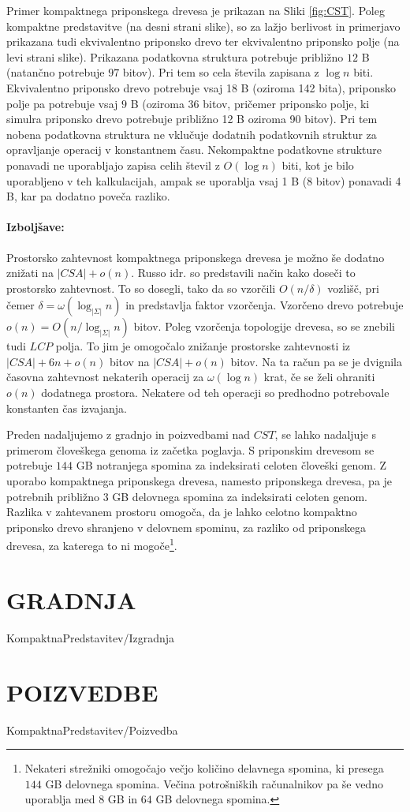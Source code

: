 Primer kompaktnega priponskega drevesa je prikazan na Sliki \ref{fig:CST}. Poleg kompaktne predstavitve (na desni strani slike), so za lažjo berlivost in primerjavo prikazana tudi ekvivalentno priponsko drevo ter ekvivalentno priponsko polje (na levi strani slike). Prikazana podatkovna struktura potrebuje približno $12$ B (natančno potrebuje $97$ bitov). Pri tem so cela števila zapisana z $\log{n}$ biti. Ekvivalentno priponsko drevo potrebuje vsaj 18 B (oziroma 142 bita), priponsko polje pa potrebuje vsaj $9$ B (oziroma 36 bitov, pričemer priponsko polje, ki simulra priponsko drevo potrebuje približno 12 B oziroma 90 bitov). Pri tem nobena podatkovna struktura ne vklučuje dodatnih podatkovnih struktur za opravljanje operacij v konstantnem času. Nekompaktne podatkovne strukture ponavadi ne uporabljajo zapisa celih števil z $O(\log{n})$ biti, kot je bilo uporabljeno v teh kalkulacijah, ampak se uporablja vsaj 1 B (8 bitov) ponavadi 4 B, kar pa dodatno poveča razliko.

\paragraph{Izboljšave:}
Prostorsko zahtevnost kompaktnega priponskega drevesa je možno še dodatno znižati na $|CSA|+o(n)$. Russo idr. \cite{Russo2008} so predstavili način kako doseči to prostorsko zahtevnost. To so dosegli, tako da so vzorčili $O(n/\delta)$ vozlišč, pri čemer $\delta=\omega(\log_{|\Sigma|}{n})$ in predstavlja faktor vzorčenja. Vzorčeno drevo potrebuje $o(n)=O(n/\log_{|\Sigma|}{n})$ bitov. Poleg vzorčenja topologije drevesa, so se znebili tudi $LCP$ polja. To jim je omogočalo znižanje prostorske zahtevnosti iz $|CSA|+6n+o(n)$ bitov na $|CSA|+o(n)$ bitov. Na ta račun pa se je dvignila časovna zahtevnost nekaterih operacij za $\omega(\log{n})$ krat, če se želi ohraniti $o(n)$ dodatnega prostora. Nekatere od teh operacji so predhodno potrebovale konstanten čas izvajanja.

Preden nadaljujemo z gradnjo in poizvedbami nad $CST$, se lahko nadaljuje s primerom človeškega genoma iz začetka poglavja. S priponskim drevesom se potrebuje $144$ GB notranjega spomina za indeksirati celoten človeški genom. Z uporabo kompaktnega priponskega drevesa, namesto priponskega drevesa, pa je potrebnih približno $3$ GB delovnega spomina za indeksirati celoten genom. Razlika v zahtevanem prostoru omogoča, da je lahko celotno kompaktno priponsko drevo shranjeno v delovnem spominu, za razliko od priponskega drevesa, za katerega to ni mogoče\footnote{Nekateri strežniki omogočajo večjo količino delavnega spomina, ki presega $144$ GB delovnega spomina. Večina potrošniških računalnikov pa še vedno uporablja med $8$ GB in $64$ GB delovnega spomina.}.

\section{GRADNJA}\label{sec:CSTizgradnja}
{KompaktnaPredstavitev/Izgradnja}

\section{POIZVEDBE}\label{sec:CSTpoizvedba}
{KompaktnaPredstavitev/Poizvedba}


